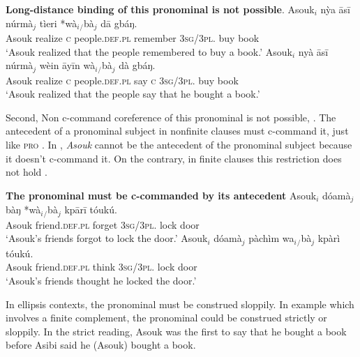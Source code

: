\documentclass[output=paper,colorlinks,citecolor=brown]{langscibook}
\begin{document}
\ea%
    \label{ex:sulemana:18}
    {\bf{Long-distance binding of this pronominal is not possible}}.
    \ea%
    \label{ex:sulemana:18a}
    \gll    Asouk$_i$  nỳa  āsī núrmà$_j$ tìeri  *wà$_i${}$_/$bà$_j$ dā gbáŋ.\\
            Asouk realize \textsc{c} people.\textsc{def.pl} remember \textsc{3sg/3pl}.  buy book\\
    \glt    `Asouk realized that the people remembered to buy a book.'
    \ex%
    \label{ex:sulemana:18b}
    \gll    Asouk$_i$ nyà āsī núrmà$_j$ wèin āyīn  wà$_i${}$_/$bà$_j$ dà gbáŋ.\\
            Asouk realize \textsc{c} people.\textsc{def.pl}  say \textsc{c} \textsc{3sg/3pl}.  buy book\\
    \glt    `Asouk realized that the people say that he bought a book.' 
    \z
\z

Second, Non c-command coreference of this pronominal is not possible, . The antecedent of a pronominal subject in nonfinite clauses must c-command it, just like \textsc{pro} . In , {\it{Asouk}} cannot be the antecedent of the pronominal subject because it doesn't c-command it. On the contrary, in finite clauses this restriction does not hold . 

\ea%
    \label{ex:sulemana:19}
    {\bf{The pronominal must be c-commanded by its antecedent}}
    \ea%
    \label{ex:sulemana:19a}
    \gll    Asouk$_i$  dóamà$_j$ bàŋ *wà$_i${}$_/$bà$_j$ kpārī tóukú.\\
            Asouk friend.\textsc{def.pl} forget \textsc{3sg/3pl}. lock door\\
    \glt    `Asouk's friends forgot to lock the door.' 
    \ex%
    \label{ex:sulemana:19b}
    \gll    Asouk$_i$  dóamà$_j$ pàchìm  wa$_i${}$_/$bà$_j$ kpàrì tóukú.\\
            Asouk friend.\textsc{def.pl} think \textsc{3sg/3pl}. lock door\\
    \glt    `Asouk's friends thought he locked the door.' 
    \z
\z

In ellipsis contexts, the pronominal must be construed sloppily. In example  which involves a finite complement, the pronominal could be construed strictly or sloppily. In the strict reading, Asouk was the first to say that he bought a book before Asibi said he (Asouk) bought a book. 

\end{document}
